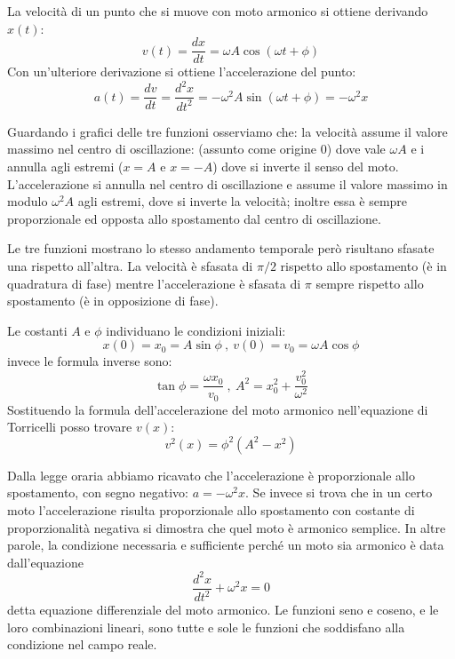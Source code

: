 \documentclass[class=book, crop=false, oneside, 12pt]{standalone}
\begin{document}
La velocità di un punto che si muove con moto armonico si ottiene derivando \(x(t)\):
\begin{equation}
  v(t) = \frac{dx}{dt} = \omega A \cos (\omega t + \phi)
\end{equation}
Con un'ulteriore derivazione si ottiene l'accelerazione del punto:
\begin{equation}
  a(t) = \frac{dv}{dt} = \frac{d^2 x}{dt^2} = -\omega^2 A \sin (\omega t + \phi) = -\omega^2 x
\end{equation}

Guardando i grafici delle tre funzioni osserviamo che:
la velocità assume il valore massimo nel centro di oscillazione: (assunto come origine 0) dove vale \(\omega A\) e i annulla agli estremi (\(x =A\) e \(x =-A\)) dove si inverte il senso del moto.
L'accelerazione si annulla nel centro di oscillazione e assume il valore massimo in modulo \(\omega^2 A\) agli estremi, dove si inverte la velocità; inoltre essa è sempre proporzionale ed opposta allo spostamento dal centro di oscillazione.

Le tre funzioni mostrano lo stesso andamento temporale però risultano sfasate una rispetto all'altra.
La velocità è sfasata di \(\pi / 2\) rispetto allo spostamento (è in quadratura di fase) mentre l'accelerazione è sfasata di \(\pi\) sempre rispetto allo spostamento (è in opposizione di fase).

Le costanti \(A\) e \(\phi\) individuano le condizioni iniziali:
\begin{equation}
  x(0) = x_0 = A \sin \phi \ , \
  v(0) = v_0 = \omega A \cos \phi
\end{equation}
invece le formula inverse sono:
\begin{equation}
  \tan \phi = \frac{\omega x_0}{v_0} \ , \
  A^2 = x_0^2 + \frac {v_0^2}{\omega^2}
\end{equation}
Sostituendo la formula dell'accelerazione del moto armonico nell'equazione di Torricelli posso trovare \(v(x)\):
\begin{equation}
  v^2(x) = \phi^2 (A^2 - x^2)
\end{equation}

Dalla legge oraria abbiamo ricavato che l'accelerazione è proporzionale allo spostamento, con segno negativo: \(a = - \omega^2 x\). Se invece si trova che in un certo moto l'accelerazione risulta proporzionale allo spostamento con costante di proporzionalità negativa si dimostra che quel moto è armonico semplice.
In altre parole, la condizione necessaria e sufficiente perché un moto sia armonico è data dall'equazione
\begin{equation}
  \frac{d^2 x}{dt^2} + \omega^2 x = 0
\end{equation}
detta equazione differenziale del moto armonico. Le funzioni seno e coseno, e le loro combinazioni lineari, sono tutte e sole le funzioni che soddisfano alla condizione nel campo reale.
\end{document}
